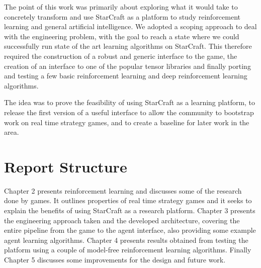 The point of this work was primarily about exploring what it would take to
concretely transform and use StarCraft as a platform to study reinforcement
learning and general artificial intelligence. We adopted a scoping approach to
deal with the engineering problem, with the goal to reach a state where we could
successfully run state of the art learning algorithms on StarCraft. This
therefore required the construction of a robust and generic interface to the
game, the creation of an interface to one of the popular tensor libraries and
finally porting and testing a few basic reinforcement learning and deep
reinforcement learning algorithms.

The idea was to prove the feasibility of using StarCraft as a learning platform,
to release the first version of a useful interface to allow the community to
bootstrap work on real time strategy games, and to create a baseline for later
work in the area.

\section{Report Structure}

Chapter 2 presents reinforcement learning and discusses some of the research
done by games. It outlines properties of real time strategy games and it seeks
to explain the benefits of using StarCraft as a research platform. Chapter 3
presents the engineering approach taken and the developed architecture, covering
the entire pipeline from the game to the agent interface, also providing some
example agent learning algorithms. Chapter 4 presents results obtained from
testing the platform using a couple of model-free reinforcement learning
algorithms. Finally Chapter 5 discusses some improvements for the design and
future work.
